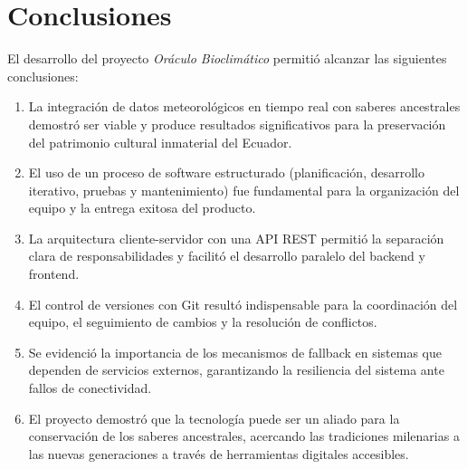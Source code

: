 \documentclass[conference]{IEEEtran}
\begin{document}
\section{Conclusiones}

El desarrollo del proyecto \textit{Oráculo Bioclimático} permitió alcanzar las siguientes conclusiones:

\begin{enumerate}
    \item La integración de datos meteorológicos en tiempo real con saberes ancestrales demostró ser viable y produce resultados significativos para la preservación del patrimonio cultural inmaterial del Ecuador.

    \item El uso de un proceso de software estructurado (planificación, desarrollo iterativo, pruebas y mantenimiento) fue fundamental para la organización del equipo y la entrega exitosa del producto.

    \item La arquitectura cliente-servidor con una API REST permitió la separación clara de responsabilidades y facilitó el desarrollo paralelo del backend y frontend.

    \item El control de versiones con Git resultó indispensable para la coordinación del equipo, el seguimiento de cambios y la resolución de conflictos.

    \item Se evidenció la importancia de los mecanismos de fallback en sistemas que dependen de servicios externos, garantizando la resiliencia del sistema ante fallos de conectividad.

    \item El proyecto demostró que la tecnología puede ser un aliado para la conservación de los saberes ancestrales, acercando las tradiciones milenarias a las nuevas generaciones a través de herramientas digitales accesibles.
\end{enumerate}
\end{document}

